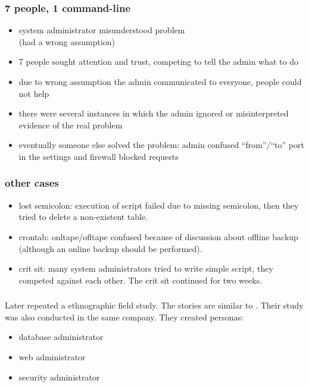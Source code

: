 \begin{frame}
	\frametitle{7 people, 1 command-line~\cite{barrett2004field}}

	\begin{itemize}[<+-| alert@+>]
	\item system administrator misunderstood problem \\ (had a wrong assumption)
	\item 7 people sought attention and trust, competing to tell the admin what to do
	\item due to wrong assumption the admin communicated to everyone, people could not help
	\item there were several instances in which the admin ignored or misinterpreted evidence of the real problem
	\item eventually someone else solved the problem: admin confused ``from''/``to'' port in the settings and firewall blocked requests
	\end{itemize}
\end{frame}

\begin{frame}
	\frametitle{other cases~\cite{barrett2004field}}

	\begin{itemize}[<+-| alert@+>]
	\item lost semicolon: execution of script failed due to missing semicolon, then they tried to delete a non-existent table.
	\item crontab: onltape/ofltape confused because of discussion about offline backup (although an online backup should be performed).
	\item crit sit: many system administrators tried to write simple script, they competed against each other. The crit sit continued for two weeks.
	\end{itemize}
\end{frame}


\begin{frame}
	\frametitle{\citet{haber2007design}}

	Later \citet{haber2007design} repeated a ethnographic field study.
	The stories are similar to \citet{barrett2004field}.
	Their study was also conducted in the same company.
	They created personas:

	\begin{itemize}
	\item database administrator
	\item web administrator
	\item security administrator
	\end{itemize}
\end{frame}



